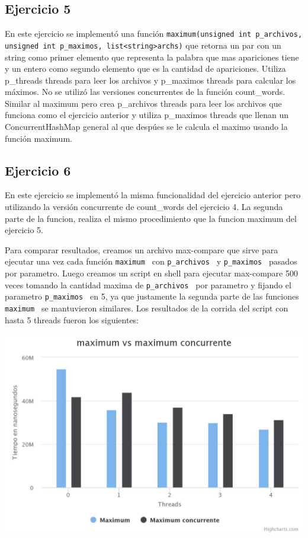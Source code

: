 \documentclass[a4paper]{article}
\begin{document}
{\subsection{Ejercicio 5}
En este ejercicio se implementó una función {\tt maximum(unsigned int p_archivos, unsigned int p_maximos, list<string>archs)} que retorna un par con un string como primer elemento que representa la palabra que mas apariciones tiene y un entero como segundo elemento que es la cantidad de apariciones. Utiliza p_threads threads para leer los archivos y p_maximos threads para calcular los máximos. No se utilizó las versiones concurrentes de la función count_words. Similar al maximum pero crea p_archivos threads para leer los archivos que funciona como el ejercicio anterior y utiliza p_maximos threads que llenan un ConcurrentHashMap general al que despúes se le calcula el maximo usando la función maximum.


\subsection{Ejercicio 6}

En este ejercicio se implementó la misma funcionalidad del ejercicio anterior pero utilizando la versión concurrente de count_words del ejercicio 4. La segunda parte de la funcion, realiza el mismo procedimiento que la funcion maximum del ejercicio 5.

Para comparar resultados, creamos un archivo max-compare que sirve para ejecutar una vez cada función {\tt maximum } con {\tt p_archivos } y {\tt p_maximos } pasados por parametro. Luego creamos un script en shell para ejecutar max-compare 500 veces tomando la cantidad maxima de {\tt p_archivos } por parametro y fijando el parametro {\tt p_maximos } en 5, ya que justamente la segunda parte de las funciones {\tt maximum } se mantuvieron similares. Los resultados de la corrida del script con hasta 5 threads fueron los siguientes:

\includegraphics[scale=0.35]{imagenes/chart.jpeg}

}
\end{document}
